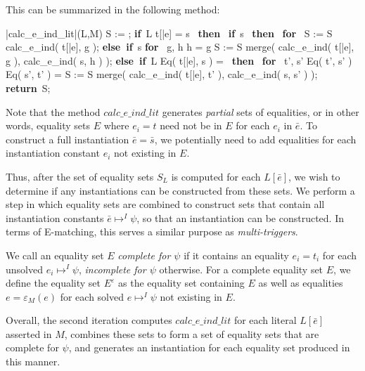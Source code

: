 \documentclass{llncs}
\def\IF{\qtab\keyword{if}\ }
\def\THEN{\ \keyword{then}\ }
\def\ELSEIF{\untab\qtab\keyword{else if}\ }
\def\FI{\untab}
\def\RETURN{\keyword{return}\ }
\def\ENDPROC{\untab}
\def\DOFOR{\qtab\keyword{for}\ }
\def\ENDFOR{\untab}
\def\keyword#1{\mbox{\normalshape\bf #1}}
\begin{document}
This can be summarized in the following method:

\begin{program}
\PROC |calc\_e\_ind\_lit|(L,M) \BODY
  S := \emptyset;
  \IF L  t[\bar{e}] = s \THEN
    \IF s  \THEN
      \DOFOR {} 
        S := S \cup calc\_e\_ind( t[\bar{e}], g );
      \ENDFOR
    \ELSEIF s 
      \DOFOR {} g, h  h = g
        S := S \cup merge( calc\_e\_ind( t[\bar{e}], g ), calc\_e\_ind( s, h ) );
      \ENDFOR 
    \FI
  \ELSEIF L  Eq( t[\bar{e}], s ) = \bot \THEN
    \DOFOR {} t', s'  Eq( t', s' )  Eq( s', t' ) = \bot
      S := S \cup merge( calc\_e\_ind( t[\bar{e}], t' ), calc\_e\_ind( s, s' ) );
    \ENDFOR
  \FI
  \RETURN S;
\ENDPROC
\end{program}

Note that the method $calc\_e\_ind\_lit$ generates \emph{partial} sets of equalities, or in other words, equality sets $E$ where $e_i = t$ need not be in $E$ for each $e_i$ in $\bar{e}$.
To construct a full instantiation $\bar{e} = \bar{s}$, we potentially need to add equalities for each instantiation constant $e_i$ not existing in $E$.

Thus, after the set of equality sets $S_L$ is computed for each $L[\bar{e}]$, we wish to determine if any instantiations can be constructed from these sets.
We perform a step in which equality sets are combined to construct sets that contain all instantiation constants $\bar{e} \mapsto^I \psi$, so that an instantiation can be constructed.
In terms of E-matching, this serves a similar purpose as \emph{multi-triggers}.

We call an equality set $E$ \emph{complete for $\psi$} if it contains an equality $e_i = t_i$ for each unsolved $e_i \mapsto^I \psi$, \emph{incomplete for $\psi$} otherwise.
For a complete equality set $E$, we define the equality set $E^\varepsilon$ as the equality set containing $E$ as well as equalities $ e = \varepsilon_M( e )$ for each solved $e \mapsto^I \psi$ not existing in $E$.

Overall, the second iteration computes $calc\_e\_ind\_lit$ for each literal $L[\bar{e}]$ asserted in $M$, combines these sets to form a set of equality sets that are complete for $\psi$, and generates an instantiation for each equality set produced in this manner.
\end{document}
